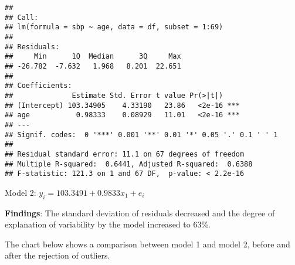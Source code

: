 \documentclass[
]{article}
\newenvironment{Shaded}{\begin{snugshade}}{\end{snugshade}}
\newcommand{\AttributeTok}[1]{\textcolor[rgb]{0.77,0.63,0.00}{#1}}
\newcommand{\FunctionTok}[1]{\textcolor[rgb]{0.00,0.00,0.00}{#1}}
\newcommand{\NormalTok}[1]{#1}
\newcommand{\OtherTok}[1]{\textcolor[rgb]{0.56,0.35,0.01}{#1}}
\newcommand{\SpecialCharTok}[1]{\textcolor[rgb]{0.00,0.00,0.00}{#1}}
\newcommand{\StringTok}[1]{\textcolor[rgb]{0.31,0.60,0.02}{#1}}
\begin{document}
\begin{verbatim}
## 
## Call:
## lm(formula = sbp ~ age, data = df, subset = 1:69)
## 
## Residuals:
##     Min      1Q  Median      3Q     Max 
## -26.782  -7.632   1.968   8.201  22.651 
## 
## Coefficients:
##              Estimate Std. Error t value Pr(>|t|)    
## (Intercept) 103.34905    4.33190   23.86   <2e-16 ***
## age           0.98333    0.08929   11.01   <2e-16 ***
## ---
## Signif. codes:  0 '***' 0.001 '**' 0.01 '*' 0.05 '.' 0.1 ' ' 1
## 
## Residual standard error: 11.1 on 67 degrees of freedom
## Multiple R-squared:  0.6441, Adjusted R-squared:  0.6388 
## F-statistic: 121.3 on 1 and 67 DF,  p-value: < 2.2e-16
\end{verbatim}

Model 2: \(y_{i} = 103.3491 + 0.9833x_{1} + e_{i}\)

\textbf{Findings}: The standard deviation of residuals decreased and the
degree of explanation of variability by the model increased to 63\%.

The chart below shows a comparison between model 1 and model 2, before
and after the rejection of outliers.

\begin{Shaded}
\end{Shaded}
\end{document}
